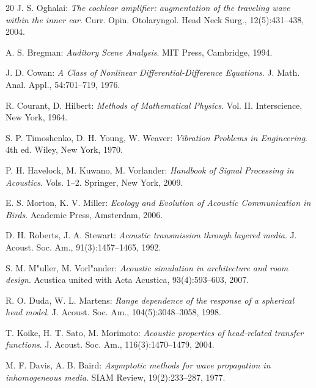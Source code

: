 ﻿\documentclass[12pt, a4paper]{article}
\theoremstyle{definition}
\theoremstyle{remark}
\begin{document}
\begin{thebibliography}{20}
  J. S. Oghalai:
  \textit{The cochlear amplifier: augmentation of the traveling wave within the inner ear}.
  Curr. Opin. Otolaryngol. Head Neck Surg., 12(5):431--438, 2004.

  A. S. Bregman:
  \textit{Auditory Scene Analysis}.
  MIT Press, Cambridge, 1994.

  J. D. Cowan:
  \textit{A Class of Nonlinear Differential-Difference Equations}.
  J. Math. Anal. Appl., 54:701--719, 1976.

  R. Courant, D. Hilbert:
  \textit{Methods of Mathematical Physics}. Vol.
  II. Interscience, New York, 1964.

  S. P. Timoshenko, D. H. Young, W. Weaver:
  \textit{Vibration Problems in Engineering}. 4th ed.
  Wiley, New York, 1970.

  P. H. Havelock, M. Kuwano, M. Vorlander:
  \textit{Handbook of Signal Processing in Acoustics}. Vols. 1--2.
  Springer, New York, 2009.

  E. S. Morton, K. V. Miller:
  \textit{Ecology and Evolution of Acoustic Communication in Birds}.
  Academic Press, Amsterdam, 2006.

  D. H. Roberts, J. A. Stewart:
  \textit{Acoustic transmission through layered media}.
  J. Acoust. Soc. Am., 91(3):1457--1465, 1992.

  S. M. M{"u}ller, M. Vorl{"a}nder:
  \textit{Acoustic simulation in architecture and room design}.
  Acustica united with Acta Acustica, 93(4):593--603, 2007.

  R. O. Duda, W. L. Martens:
  \textit{Range dependence of the response of a spherical head model}.
  J. Acoust. Soc. Am., 104(5):3048--3058, 1998.

  T. Koike, H. T. Sato, M. Morimoto:
  \textit{Acoustic properties of head-related transfer functions}.
  J. Acoust. Soc. Am., 116(3):1470--1479, 2004.

  M. F. Davis, A. B. Baird:
  \textit{Asymptotic methods for wave propagation in inhomogeneous media}.
  SIAM Review, 19(2):233--287, 1977.

\end{thebibliography}
\end{document}

